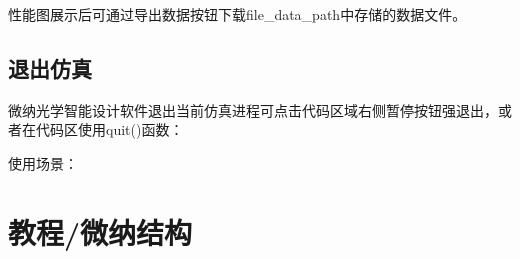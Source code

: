 \documentclass[letterpaper,10pt,english]{sphinxmanual}
\begin{document}
{{{{{{\begin{sphinxVerbatim}[commandchars=\\\{\}]
  
   
   
\end{sphinxVerbatim}

\sphinxAtStartPar
性能图展示后可通过导出数据按钮下载file\_data\_path中存储的数据文件。


\subsection{退出仿真}
\label{\detokenize{_u8f6f_u4ef6API_u63a5_u53e3/_u4eff_u771f/_u4eff_u771f:id11}}
\sphinxAtStartPar
微纳光学智能设计软件退出当前仿真进程可点击代码区域右侧暂停按钮强退出，或者在代码区使用quit()函数：

\begin{sphinxVerbatim}[commandchars=\\\{\}]
 
\end{sphinxVerbatim}

\sphinxAtStartPar
使用场景：

\begin{sphinxVerbatim}[commandchars=\\\{\}]
\end{sphinxVerbatim}

\sphinxstepscope


\section{教程/微纳结构}
\label{\detokenize{_u8f6f_u4ef6API_u63a5_u53e3/_u5fae_u7eb3_u7ed3_u6784/_u5fae_u7eb3_u7ed3_u6784:id1}}\label{\detokenize{_u8f6f_u4ef6API_u63a5_u53e3/_u5fae_u7eb3_u7ed3_u6784/_u5fae_u7eb3_u7ed3_u6784::doc}}

}}}}}}
\end{document}
